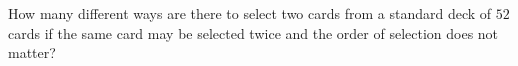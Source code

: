How many different ways are there to select two cards from a standard deck of $52$ cards if the same card may be selected twice and the order of selection does not matter?
